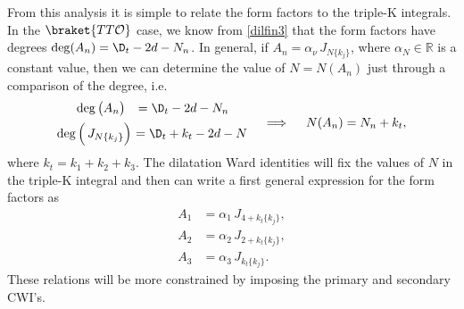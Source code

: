 \documentclass[a4paper,11pt,openright,twoside]{book}
\newcommand{\mO}{\mathcal{O}}
\let\a=\alpha   \let\b=\beta   \let\g=\gamma   \let\d=\delta
\let\n=\nu      \let\x=\xi     \let\p=\pi      \let\r=\rho
\numberwithin{equation}{section}
\begin{document}
{{{From this analysis it is simple to relate the form factors to the triple-K integrals. In the $\braket{TT\mO}$ case, we know from \eqref{dilfin3} that the form factors have degrees $\deg(A_n)=\D_t-2d-N_n$. In general, if $A_n=\a_\n\,J_{N\{k_j\}}$, where $\a_N\in \mathbb R$ is a constant value, then we can determine the value of $N=N(A_n)$ just through a comparison of the degree, i.e.  
\begin{equation}
	\begin{matrix}
		\hspace{2.5ex}\deg\big(A_n\big)&\hspace{-4.5ex}=\D_t-2d-N_n\\[1.2ex]
		\deg\Big(\,J_{N\{k_j\}}\Big)&\hspace{-1.5ex}=\D_t+k_t-2d-N
	\end{matrix}\quad\implies\quad
	N(A_n)=N_n+k_t,
\end{equation}
where $k_t=k_1+k_2+k_3$. The dilatation Ward identities will fix the values of $N$ in the triple-K integral and then can write a first general expression for the form factors as
\begin{equation}
	\begin{split}
		A_1&=\a_1\,J_{4+k_t\{k_j\}},\\
		A_2&=\a_2\,J_{2+k_t\{k_j\}},\\
		A_3&=\a_3\,J_{k_t\{k_j\}}.
	\end{split}\label{result1}
\end{equation}
These relations will be more constrained by imposing the primary and secondary CWI's. 
}}}
\end{document}
